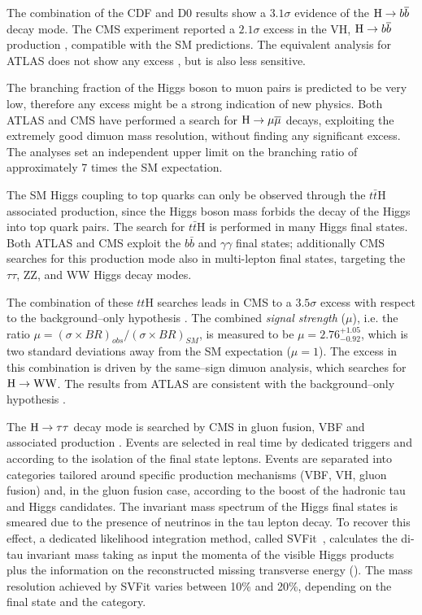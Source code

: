 The combination of the CDF and D0 results \cite{Aaltonen:2012qt} show a $3.1\sigma$ evidence of the $\mathrm{H} \rightarrow b \overline{b}$ decay mode. The CMS experiment reported a $2.1\sigma$ excess in the VH, $\mathrm{H} \rightarrow b \overline{b}$ production \cite{Chatrchyan:2013zna}, compatible with the SM predictions. The equivalent analysis for ATLAS does not show any excess \cite{TheATLAScollaboration:2013lia}, but is also less sensitive.

The branching fraction of the Higgs boson to muon pairs is predicted to be very low, therefore any excess might be a strong indication of new physics. Both ATLAS \cite{Aad:2014xva} and CMS \cite{CMS:2013aga} have performed a search for  $\mathrm{H} \rightarrow \mu \overline{\mu}$ decays, exploiting the extremely good dimuon mass resolution, without finding any significant excess. The analyses set an independent upper limit on the branching ratio of approximately 7 times the SM expectation.

The SM Higgs coupling to top quarks can only be observed through the $t\bar{t}$H associated production, since the Higgs boson mass forbids the decay of the Higgs into top quark pairs. The search for $t\bar{t}$H \cite{ATLASCONF:2014043,CMS:2014ega} is performed in many Higgs final states. Both ATLAS and CMS exploit the $b\bar{b}$ and $\gamma\gamma$ final states; additionally CMS searches for this production mode also in multi-lepton final states, targeting the $\tau\tau$, ZZ, and WW Higgs decay modes.

The combination of these $tt$H searches leads in CMS to a $3.5\sigma$ excess with respect to the background--only hypothesis \cite{CMS:2014ega}. The combined \emph{signal strength} ($\mu$), i.e. the ratio $\mu = (\sigma \times BR)_{obs} / (\sigma \times BR)_{SM}$, is measured to be $\mu = 2.76^{+1.05}_{-0.92}$, which is two standard deviations away from the SM expectation ($\mu = 1$). The excess in this combination is driven by the same--sign dimuon analysis, which searches for $\mathrm{H}\rightarrow \mathrm{W}\mathrm{W}$. The results from ATLAS are consistent with the background--only hypothesis \cite{ATLASCONF:2014043}.

The $\mathrm{H} \to \tau \tau$ decay mode is searched by CMS in gluon fusion, VBF and associated production \cite{H_tautau}. Events are selected in real time by dedicated triggers and according to the isolation of the final state leptons. Events are separated into categories tailored around specific production mechanisms (VBF, VH, gluon fusion) and, in the gluon fusion case, according to the boost of the hadronic tau and Higgs candidates. The invariant mass spectrum of the Higgs final states is smeared due to the presence of neutrinos in the tau lepton decay. To recover this effect, a dedicated likelihood integration method, called SVFit~\cite{Bianchini:2014vza}, calculates the di-tau invariant mass taking as input the momenta of the visible Higgs products plus the information on the reconstructed missing transverse energy (\MET). The mass resolution achieved by SVFit varies between 10\% and 20\%, depending on the final state and the category.

